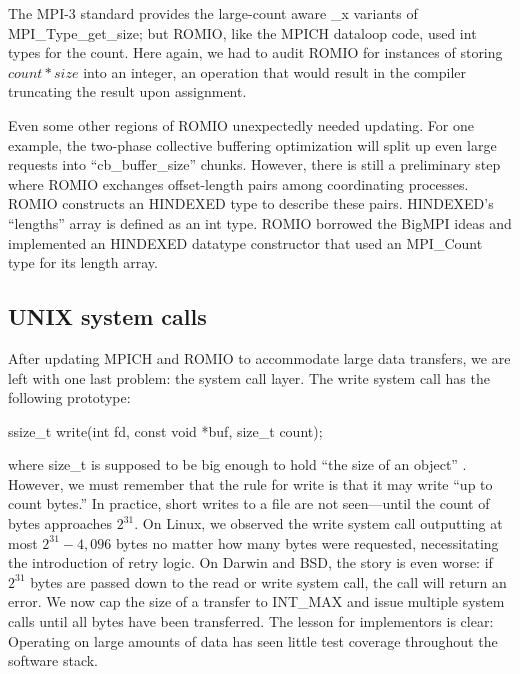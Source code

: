 The MPI-3 standard provides the large-count aware \_x variants of
MPI\_Type\_get\_size; but
ROMIO, like the MPICH dataloop code, used int types for the count.
Here again,  we had to audit ROMIO for instances of storing $count * size$
into an integer, an operation that would result in the compiler truncating the
result upon assignment.

Even some other regions of ROMIO unexpectedly needed updating. For one example, the
two-phase collective buffering optimization will split up even large requests
into ``cb\_buffer\_size'' chunks.  However, there is still a preliminary step
where ROMIO exchanges offset-length pairs among coordinating processes.  ROMIO
constructs an HINDEXED type to describe these pairs. HINDEXED's ``lengths'' array
is defined as an int type.  ROMIO borrowed the BigMPI ideas and implemented an
HINDEXED datatype constructor that used an MPI\_Count type for its length array.


\subsection{UNIX system calls}

After updating MPICH and ROMIO to accommodate large data transfers,
we are left with one last problem: the system call layer.
The write system call has the following prototype:

\begin{code}
ssize_t write(int fd, const void *buf, size_t count);
\end{code}

\noindent
where size\_t is supposed to be big enough to hold ``the size of an object''
\cite{posix-std}.  However, we must remember that the rule for write is that it may
write ``up to count bytes.''  In practice, short writes to a file are not seen---until the count of bytes approaches $2^{31}$.  On Linux, we observed 
the write system call outputting at most 
$2^{31}-4,096$ bytes no matter how many bytes were requested,
necessitating the introduction of retry
logic.  On Darwin and BSD, the story is even worse: if $2^{31}$ bytes are passed
down to the read or write system call, the call will return an error.  We now
cap the size of a transfer to INT\_MAX and issue multiple system calls until
all bytes have been transferred.  The lesson for implementors is clear:
Operating on large amounts of data has seen little test coverage throughout the software stack.
